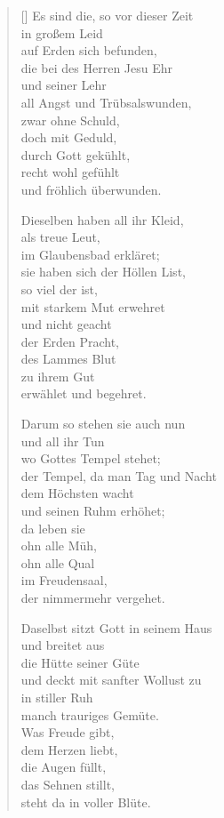 \begin{multicols}{2}
\begin{verse}[\versewidth]
 Es sind die, so vor dieser Zeit\\
in großem Leid\\
auf Erden sich befunden,\\
die bei des Herren Jesu Ehr\\
und seiner Lehr\\
all Angst und Trübsalswunden,\\
zwar ohne Schuld,\\
doch mit Geduld,\\
durch Gott gekühlt,\\
recht wohl gefühlt\\
und fröhlich überwunden.

 Dieselben haben all ihr Kleid,\\
als treue Leut,\\
im Glaubensbad erkläret;\\
sie haben sich der Höllen List,\\
so viel der ist,\\
mit starkem Mut erwehret\\
und nicht geacht\\
der Erden Pracht,\\
des Lammes Blut\\
zu ihrem Gut\\
erwählet und begehret.

 Darum so stehen sie auch nun\\
und all ihr Tun\\
wo Gottes Tempel stehet;\\
der Tempel, da man Tag und Nacht\\
dem Höchsten wacht\\
und seinen Ruhm erhöhet;\\
da leben sie\\
ohn alle Müh,\\
ohn alle Qual\\
im Freudensaal,\\
der nimmermehr vergehet.

 Daselbst sitzt Gott in seinem Haus\\
und breitet aus\\
die Hütte seiner Güte\\
und deckt mit sanfter Wollust zu\\
in stiller Ruh\\
manch trauriges Gemüte.\\
Was Freude gibt,\\
dem Herzen liebt,\\
die Augen füllt,\\
das Sehnen stillt,\\
steht da in voller Blüte.


\end{verse}
\end{multicols}
